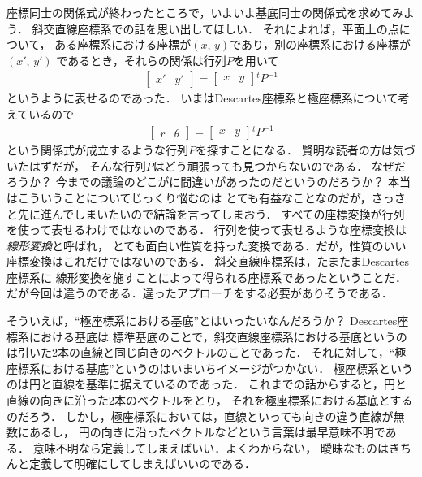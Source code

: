 座標同士の関係式が終わったところで，いよいよ基底同士の関係式を求めてみよう．
斜交直線座標系での話を思い出してほしい．
それによれば，平面上の点について，
ある座標系における座標が$(x, \, y)$であり，別の座標系における座標が$(x', \, y')$
であるとき，それらの関係は行列$P$を用いて
\begin{align*}
\left[
\begin{array}{cc}
x' & y'
\end{array}
\right]
=
\left[
\begin{array}{cc}
x & y
\end{array}
\right]
{}^t \! P^{-1}
\end{align*}
というように表せるのであった．
いまはDescartes座標系と極座標系について考えているので
\begin{align*}
\left[
\begin{array}{cc}
r & \theta
\end{array}
\right]
=
\left[
\begin{array}{cc}
x & y
\end{array}
\right]
{}^t \! P^{-1}
\end{align*}
という関係式が成立するような行列$P$を探すことになる．
賢明な読者の方は気づいたはずだが，
そんな行列$P$はどう頑張っても見つからないのである．
なぜだろうか？ 今までの議論のどこがに間違いがあったのだというのだろうか？ 本当はこういうことについてじっくり悩むのは
とても有益なことなのだが，さっさと先に進んでしまいたいので結論を言ってしまおう．
すべての座標変換が行列を使って表せるわけではないのである．
行列を使って表せるような座標変換は\emph{線形変換}と呼ばれ，
とても面白い性質を持った変換である．だが，性質のいい座標変換はこれだけではないのである．
斜交直線座標系は，たまたまDescartes座標系に
線形変換を施すことによって得られる座標系であったということだ．
だが今回は違うのである．違ったアプローチをする必要がありそうである．

そういえば，``極座標系における基底''とはいったいなんだろうか？ Descartes座標系における基底は
標準基底のことで，斜交直線座標系における基底というのは引いた2本の直線と同じ向きのベクトルのことであった．
それに対して，``極座標系における基底''というのはいまいちイメージがつかない．
極座標系というのは円と直線を基準に据えているのであった．
これまでの話からすると，円と直線の向きに沿った2本のベクトルをとり，
それを極座標系における基底とするのだろう．
しかし，極座標系においては，直線といっても向きの違う直線が無数にあるし，
円の向きに沿ったベクトルなどという言葉は最早意味不明である．
意味不明なら定義してしまえばいい．よくわからない，
曖昧なものはきちんと定義して明確にしてしまえばいいのである．

